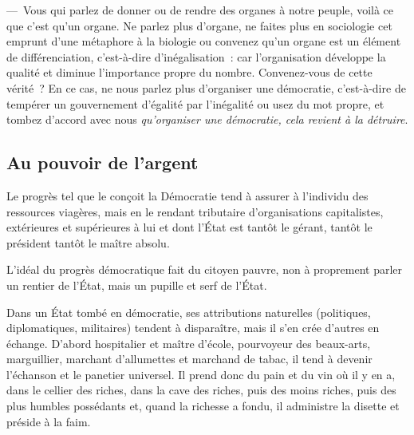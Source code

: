 \documentclass[french,twoside]{book} %
\newcommand{\astermono}{\medskip\centerline{\color{rubric}\large\selectfont{\syms ✻}}\medskip\par}%
\begin{document}
— Vous qui parlez de donner ou de rendre des organes à notre peuple, voilà ce que c’est qu’un organe. Ne parlez plus d’organe, ne faites plus en sociologie cet emprunt d’une métaphore à la biologie ou convenez qu’un organe est un élément de différenciation, c’est-à-dire d’inégalisation : car l’organisation développe la qualité et diminue l’importance propre du nombre. Convenez-vous de cette vérité ? En ce cas, ne nous parlez plus d’organiser une démocratie, c’est-à-dire de tempérer un gouvernement d’égalité par l’inégalité ou usez du mot propre, et tombez d’accord avec nous \emph{qu’organiser une démocratie, cela revient à la détruire}.\par
\subsection[Au pouvoir de l’argent]{Au pouvoir de l’argent}
\noindent Le progrès tel que le conçoit la Démocratie tend à assurer à l’individu des ressources viagères, mais en le rendant tributaire d’organisations capitalistes, extérieures et supérieures à lui et dont l’État est tantôt le gérant, tantôt le président tantôt le maître absolu.\par
L’idéal du progrès démocratique fait du citoyen pauvre, non à proprement parler un rentier de l’État, mais un pupille et serf de l’État.\par

\astermono

\noindent Dans un État tombé en démocratie, ses attributions naturelles (politiques, diplomatiques, militaires) tendent à disparaître, mais il s’en crée d’autres en échange. D’abord hospitalier et maître d’école, pourvoyeur des beaux-arts, marguillier, marchant d’allumettes et marchand de tabac, il tend à devenir l’échanson et le panetier universel. Il prend donc du pain et du vin où il y en a, dans le cellier des riches, dans la cave des riches, puis des moins riches, puis des plus humbles possédants et, quand la richesse a fondu, il administre la disette et préside à la faim.\par

\astermono
\end{document}
